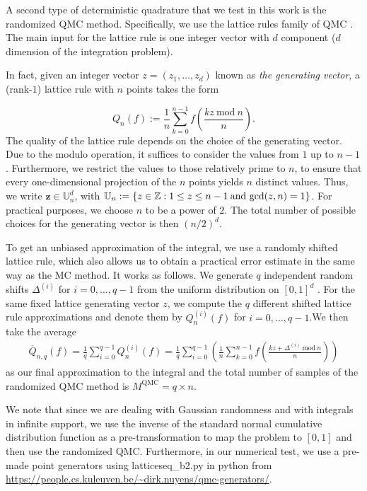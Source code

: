 A second type of deterministic quadrature that we test in this work is the randomized QMC method. Specifically, we use the lattice rules family of QMC \cite{sloan1985lattice,cools2008belgian,nuyens2014construction}.  The main input for the lattice rule is one integer vector with $d$ component ($d$ dimension of the integration problem).

In fact, given an integer vector $z = (z_1,\dots, z_d)$ known as \textit{the generating vector}, a (rank-$1$) lattice rule with $n$ points takes the form

\begin{equation}
Q_n(f):=\frac{1}{n}\sum_{k=0}^{n-1} f \left( \frac{kz \: \text{mod}\: n}{n}\right).
\end{equation}
The quality of the lattice rule depends on the choice of the generating vector. Due to the modulo operation, it suffices to consider the values from $1$ up to $n-1$. Furthermore, we restrict the values to those relatively prime to $n$, to ensure that every one-dimensional projection of the $n$ points yields $n$ distinct values. Thus, we write $\mathbf{z} \in \mathbb{U}_n^d$, with $\mathbb{U}_n:=\{z \in \mathbb{Z}: 1 \le z \le n-1\: \text{and gcd}(z,n)=1\}$. For practical purposes,  we choose $n$  to be a power of $2$. The total number of possible choices for the generating vector is then  $(n/2)^d$. 

To get an unbiased approximation of the integral, we use  a randomly shifted lattice rule, which also allows us to obtain a practical error estimate in the same way as the MC method. It works as follows. We generate $q$ independent random shifts $\Delta^{(i)}$ for $i=0,\dots,q-1$ from the uniform distribution on $[0,1]^d$ . For the same fixed lattice generating vector $z$, we compute the $q$ different shifted lattice rule approximations and denote
them by $Q^{(i )}_n(f)$ for $i=0,\dots,q-1$.We then take the average
\begin{align}
\overline{Q}_{n,q}(f)=\frac{1}{q} \sum_{i=0}^{q-1}Q^{(i )}_n(f)=\frac{1}{q}\sum_{i=0}^{q-1}\left(\frac{1}{n}\sum_{k=0}^{n-1} f \left( \frac{kz+\Delta^{(i)}  \: \text{mod}\: n}{n}\right)  \right)
\end{align}
as our final approximation to the integral and the total number of samples of the randomized QMC method is $M^{\text{QMC}}=q \times n$.

We note that since we are dealing with Gaussian randomness and with integrals in infinite support, we use the inverse of the standard normal cumulative distribution function as a pre-transformation to map the problem to $[0,1]$ and then use the randomized QMC. Furthermore, in our numerical test, we use a pre-made point generators using latticeseq\_b2.py in python from   \url{https://people.cs.kuleuven.be/~dirk.nuyens/qmc-generators/}.
